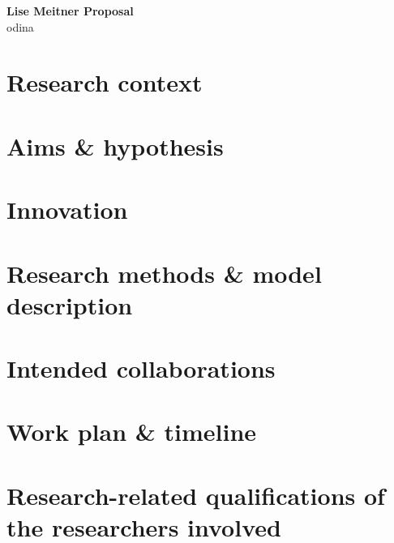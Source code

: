 \documentclass[11pt, a4paper, oneside, article]{memoir}
\begin{document}
\setlength{\baselineskip}{15pt}         %



\begin{center}
   \vspace*{-1\baselineskip}
    \huge
    \textbf{Lise Meitner Proposal}\\
    \vspace{0.5\baselineskip}
    \LARGE   
    \gls{odina}
    \vspace{0.5\baselineskip}
    \glsresetall
    \normalsize
    \tableofcontents*
\end{center}

\mainmatter
\chapter{Research context}
\label{c:context}


\chapter{Aims \& hypothesis}
\label{c:aim_hyp}


\chapter{Innovation}
\label{c:innovation}


\chapter{Research methods \& model description}
\label{c:methods}


\chapter{Intended collaborations}
\label{c:collab}


\chapter{Work plan \& timeline}
\label{c:project_plan}


\chapter{Research-related qualifications of the researchers involved}

\end{document}
